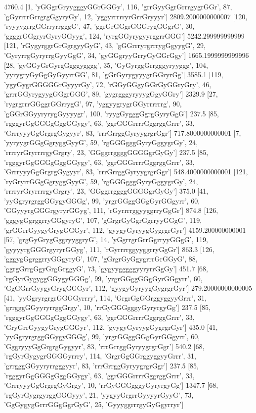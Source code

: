 4760.4 [1, 'yGGgrGryygggyGGrGGGy', 116, 'grrGyyGgrGrrrgygrGGr', 87, 'gGyrrrrGrrgrgGgyryGy', 12, 'yggyrrrrryrGrrGryyyr']
2809.2000000000007 [120, 'ryyyygrrgGGrryrrgggG', 47, 'ggrGrGGgrGGGrygGGgrG', 30, 'ggggrGGgryrGyryGGyyg', 124, 'ryrgGGyrygyyrggrrGGG']
5242.299999999999 [121, 'rGygyrggrGrGgrgyyGyG', 43, 'gGGrrryrgrrrygGgyygG', 29, 'GyryrrgGyryrrgGyyGgG', 34, 'gyGGgryyGrryGyGGrGgy']
1665.1999999999996 [28, 'gyGGyGrGyrgGgggygggg', 35, 'GyGyrggGrrgggyryyggg', 104, 'yyrygryGyGgGyGyyrrGG', 81, 'gGrGyrygyyygrGGryrGg']
3585.1 [119, 'ygyGygrGGGGGrGyyyrGy', 72, 'rGGyGGgyGGrGyGGryGry', 46, 'grrrGGyrygyygGGgrGGG', 89, 'gygrgggyryyygGgyGGry']
2329.9 [27, 'rygrgrrrGGggrGGrrygG', 97, 'yggyygrygrGGyrrrrrrg', 90, 'gGGrGGyyryrygGyyyygr', 100, 'ryygGygggGgrgGyryGgG']
237.5 [85, 'rgggyrGgGGGgGggGGygy', 63, 'ggrGGGrrrrGggrggGrrr', 33, 'GrrryyyGgGrgrgGygyyr', 83, 'rrrGrrggGyryygrgrGgr']
717.8000000000001 [7, 'yyryygrGGgGgryggGyyG', 59, 'rgGGGgggGyryGggygrGy', 24, 'rrrryrGryrrrrgyGrgry', 23, 'GGggrrggggGGGGgrGyGy']
237.5 [85, 'rgggyrGgGGGgGggGGygy', 63, 'ggrGGGrrrrGggrggGrrr', 33, 'GrrryyyGgGrgrgGygyyr', 83, 'rrrGrrggGyryygrgrGgr']
548.4000000000001 [121, 'ryGryrrGGgGgryggGyyG', 59, 'rgGGGgggGyryGggygrGy', 24, 'rrrryrGryrrrrgyGrgry', 23, 'GGggrrggggGGGGgrGyGy']
375.0 [41, 'yyGgryrgrggGGygyGGGg', 99, 'yrgrGGggGGgGyrGGgyrr', 60, 'GGyyyrgGGGrgyryrGGyg', 111, 'rGyrrrrggyyggrryGgGr']
874.8 [126, 'gggygGgrggrryGGgyryG', 107, 'gGrgrGyGgrGgrryyGGgG', 119, 'grGGrrGyygyGrygGGGyr', 112, 'gyygyGyryygGygrgrGyr']
4159.200000000001 [57, 'grgGyGrygGggryyggryG', 14, 'yGgrrgrGrrGgrryyGGgG', 119, 'gyyyyrgGGGrgyryrGGyg', 111, 'rGyrrrrggyyggrryGgGr']
863.3 [126, 'gggygGgrggrryGGgyryG', 107, 'gGrgrGyGgygrrrGrGGyG', 88, 'ggrgGrrgGgyGrgGrggyG', 73, 'gygyygggggyyryrrGgGy']
451.7 [68, 'rgGyrGygyggGGygyGGGg', 99, 'yrgrGGggGGgGyrGGgyrr', 60, 'GgGGrrGyygyGrygGGGyr', 112, 'gyygyGyryygGygrgrGyr']
279.20000000000005 [41, 'yyGgryrgrgrGGGGyrrry', 114, 'GrgrGgGGrggyggyyGrrr', 31, 'grrgggGGyyryrrggGrgy', 10, 'rrGyGGGgggyGyryrgyGg']
237.5 [85, 'rgggyrGgGGGgGggGGygy', 63, 'ggrGGGrrrrGggrggGrrr', 33, 'GryGrrGyygyGrygGGGyr', 112, 'gyygyGyryygGygrgrGyr']
435.0 [41, 'yyGgryrgrggGGygyGGGg', 99, 'yrgrGGggGGgGyrGGgyrr', 60, 'GggryyyGgGrgrgGygyyr', 83, 'rrrGrrggGyryygrgrGgr']
540.2 [68, 'rgGyrGygygrGGGGyrrry', 114, 'GrgrGgGGrggyggyyGrrr', 31, 'grrgggGGyyryrrgggyyr', 83, 'rrrGrrggGyryygrgrGgr']
237.5 [85, 'rgggyrGgGGGgGggGGygy', 63, 'ggrGGGrrrrGggrggGrrr', 33, 'GrrryyyGgGrgrgGyGrgy', 10, 'rrGyGGGgggyGyryrgyGg']
1347.7 [68, 'rgGyrGygrgyrggGGGyyy', 21, 'yygyyGrgrrGyyyyrGyyG', 73, 'GgGygygGrrrGGgGgrGyG', 25, 'GyyyggrrrgyGyGgyrryr']
